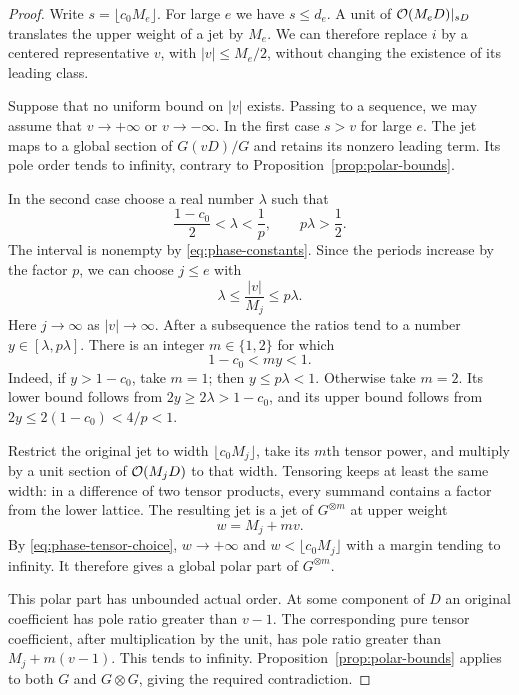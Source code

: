 \begin{proof}
Write $s=\lfloor c_0M_e\rfloor$.  For large $e$ we have $s\le d_e$.
A unit of $\mathcal O(M_eD)|_{sD}$ translates the upper weight of a jet
by $M_e$.  We can therefore replace $i$ by a centered representative
$v$, with $|v|\le M_e/2$, without changing the existence of its
leading class.

Suppose that no uniform bound on $|v|$ exists.  Passing to a sequence,
we may assume that $v\to+\infty$ or $v\to-\infty$.
In the first case $s>v$ for large $e$.  The jet maps to a global
section of $G(vD)/G$ and retains its nonzero leading term.  Its pole
order tends to infinity, contrary to Proposition~\ref{prop:polar-bounds}.

In the second case choose a real number $\lambda$ such that
\begin{equation}\label{eq:phase-lambda}
 \frac{1-c_0}{2}<\lambda<\frac1p,
 \qquad p\lambda>\frac12.
\end{equation}
The interval is nonempty by \eqref{eq:phase-constants}.
Since the periods increase by the factor $p$, we can choose $j\le e$
with
\[
 \lambda\le\frac{|v|}{M_j}\le p\lambda.
\]
Here $j\to\infty$ as $|v|\to\infty$.  After a subsequence the
ratios tend to a number $y\in[\lambda,p\lambda]$.
There is an integer $m\in\{1,2\}$ for which
\begin{equation}\label{eq:phase-tensor-choice}
 1-c_0<my<1.
\end{equation}
Indeed, if $y>1-c_0$, take $m=1$; then $y\le p\lambda<1$.
Otherwise take $m=2$.  Its lower bound follows from
$2y\ge2\lambda>1-c_0$, and its upper bound follows from
$2y\le2(1-c_0)<4/p<1$.

Restrict the original jet to width $\lfloor c_0M_j\rfloor$, take
its $m$th tensor power, and multiply by a unit section of
$\mathcal O(M_jD)$ to that width.  Tensoring keeps at least the same width:
in a difference of two tensor products, every summand contains a
factor from the lower lattice.  The resulting jet is a jet of
$G^{\otimes m}$ at upper weight
\[
 w=M_j+mv.
\]
By \eqref{eq:phase-tensor-choice}, $w\to+\infty$ and
$w<\lfloor c_0M_j\rfloor$ with a margin tending to infinity.
It therefore gives a global polar part of $G^{\otimes m}$.

This polar part has unbounded actual order.  At some component of
$D$ an original coefficient has pole ratio greater than $v-1$.
The corresponding pure tensor coefficient, after multiplication by
the unit, has pole ratio greater than $M_j+m(v-1)$.
This tends to infinity.  Proposition~\ref{prop:polar-bounds} applies
to both $G$ and $G\otimes G$, giving the required contradiction.
\end{proof}

